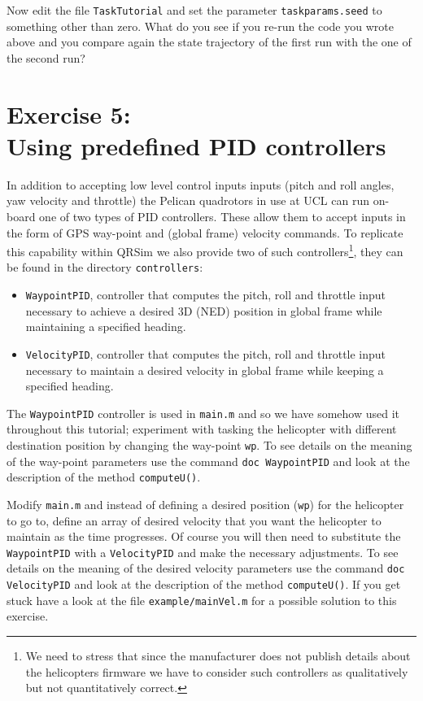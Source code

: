 \documentclass[a4paper,11pt]{article}
\begin{document}
Now edit the file \texttt{TaskTutorial} and set the parameter \texttt{taskparams.seed} to something other than zero. 
What do you see if you re-run the code you wrote above and you compare again the state trajectory of the first run with the one of the second run? 


\section*{Exercise 5:\\Using predefined PID controllers}

In addition to accepting low level control inputs inputs (pitch and roll angles, yaw velocity and throttle) the Pelican quadrotors in use at UCL can run on-board one of two types of PID controllers. These allow them to accept inputs in the form of GPS way-point and (global frame) velocity commands. 
To replicate this capability within QRSim we also provide two of such controllers\footnote{We need to stress that since the manufacturer does not publish details about the helicopters firmware we have to consider such controllers as qualitatively but not quantitatively correct.}, they can be found in the directory \texttt{controllers}:
\begin{itemize}
\item \texttt{WaypointPID}, controller that computes the pitch, roll and throttle input necessary to achieve a desired 3D (NED) position in global frame while maintaining a specified heading.
\item \texttt{VelocityPID}, controller that computes the pitch, roll and throttle input necessary to maintain a desired velocity in global frame while keeping a specified heading.
\end{itemize}

The \texttt{WaypointPID} controller is used in \texttt{main.m} and so we have somehow used it throughout this tutorial; experiment with tasking the helicopter with different destination position by changing the way-point \texttt{wp}. To see details on the meaning of the way-point parameters use the command \texttt{doc WaypointPID} and look at the description of the method \texttt{computeU()}.   

Modify \texttt{main.m} and instead of defining a desired position (\texttt{wp}) for the helicopter to go to, define an array of desired velocity that you want the helicopter to maintain as the time progresses.
Of course you will then need to substitute the \texttt{WaypointPID}  with a \texttt{VelocityPID} and make the necessary adjustments. To see details on the meaning of the desired velocity parameters use the command \texttt{doc VelocityPID} and look at the description of the method \texttt{computeU()}.   
If you get stuck have a look at the file \texttt{example/mainVel.m} for a possible solution to this exercise.
\end{document}
